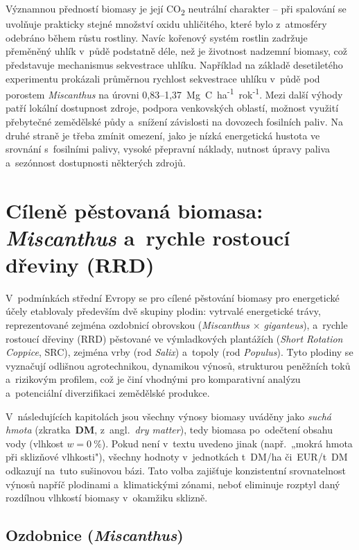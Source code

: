 Významnou předností biomasy je její CO\textsubscript{2} neutrální charakter -- při spalování se uvolňuje prakticky stejné množství oxidu uhličitého, které bylo z~atmosféry odebráno během růstu rostliny. Navíc kořenový systém rostlin zadržuje přeměněný uhlík v~půdě podstatně déle, než je životnost nadzemní biomasy, což představuje mechanismus sekvestrace uhlíku. Například \citet{AduFosu2024} na základě desetiletého experimentu prokázali průměrnou rychlost sekvestrace uhlíku v~půdě pod porostem \textit{Miscanthus} na úrovni 0{,}83--1{,}37~Mg~C~ha\textsuperscript{-1}~rok\textsuperscript{-1}. Mezi další výhody patří lokální dostupnost zdroje, podpora venkovských oblastí, možnost využití přebytečné zemědělské půdy a~snížení závislosti na dovozech fosilních paliv. Na druhé straně je třeba zmínit omezení, jako je nízká energetická hustota ve srovnání s~fosilními palivy, vysoké přepravní náklady, nutnost úpravy paliva a~sezónnost dostupnosti některých zdrojů.
 
 
\section{Cíleně pěstovaná biomasa: \textit{Miscanthus} a~rychle rostoucí dřeviny (RRD)}
\label{sec:cilene-pestovana-biomasa}

V~podmínkách střední Evropy se pro cílené pěstování biomasy pro energetické účely etablovaly především dvě skupiny plodin: vytrvalé energetické trávy, reprezentované zejména ozdobnicí obrovskou (\textit{Miscanthus $\times$ giganteus}), a~rychle rostoucí dřeviny (RRD) pěstované ve výmladkových plantážích (\textit{Short Rotation Coppice}, SRC), zejména vrby (rod \textit{Salix}) a~topoly (rod \textit{Populus}). Tyto plodiny se vyznačují odlišnou agrotechnikou, dynamikou výnosů, strukturou peněžních toků a~rizikovým profilem, což je činí vhodnými pro komparativní analýzu a~potenciální diverzifikaci zemědělské produkce.

V~následujících kapitolách jsou všechny výnosy biomasy uváděny jako
\emph{suchá hmota} (zkratka~\textbf{DM}, z~angl.~\textit{dry matter}), tedy
biomasa po~odečtení obsahu vody (vlhkost $w = 0~\%$). Pokud není v~textu
uvedeno jinak (např.~„mokrá hmota při sklizňové vlhkosti"), všechny
hodnoty v~jednotkách t~DM/ha či~EUR/t~DM odkazují na~tuto sušinovou bázi.
Tato volba zajišťuje konzistentní srovnatelnost výnosů napříč plodinami
a~klimatickými zónami, neboť eliminuje rozptyl daný rozdílnou vlhkostí
biomasy v~okamžiku sklizně.

\subsection{Ozdobnice (\textit{Miscanthus})}
\label{subsec:miscanthus}

